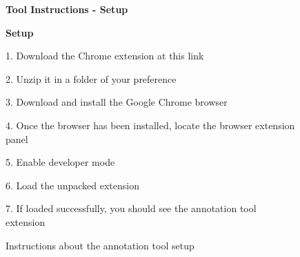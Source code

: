 

\begin{figure}
\begin{mdframed}[backgroundcolor=gray!05] 
\begin{scriptsize}

{\large \textbf{Tool Instructions - Setup}} \bigskip



{ \textbf{Setup}} \bigskip

1. Download the Chrome extension at this link \smallskip

2. Unzip it in a folder of your preference \smallskip

3. Download and install the Google Chrome browser \smallskip

4. Once the browser has been installed, locate the browser extension panel \smallskip

5. Enable developer mode \smallskip

6. Load the unpacked extension \smallskip

7. If loaded successfully, you should see the annotation tool extension

\end{scriptsize}
\end{mdframed}
\caption{Instructions about the annotation tool setup}
\end{figure}

    